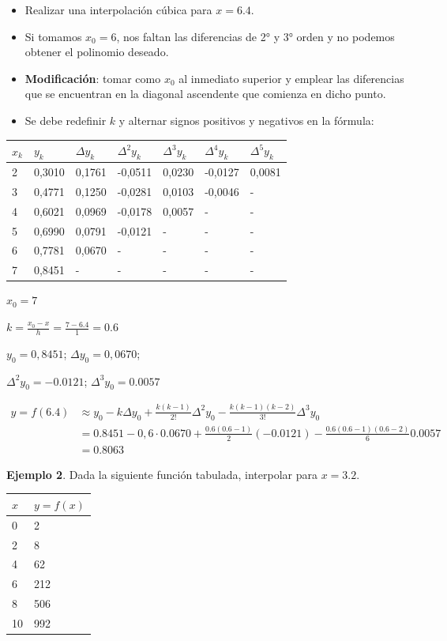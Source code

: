 \documentclass[]{book}
\providecommand{\tightlist}{%
  \setlength{\itemsep}{0pt}\setlength{\parskip}{0pt}}
\begin{document}
\begin{itemize}
\tightlist
\item
  Realizar una interpolación cúbica para \(x=6.4\).
\item
  Si tomamos \(x_0 = 6\), nos faltan las diferencias de 2° y 3° orden y no podemos obtener el polinomio deseado.
\item
  \textbf{Modificación}: tomar como \(x_0\) al inmediato superior y emplear las diferencias que se encuentran en la diagonal ascendente que comienza en dicho punto.
\item
  Se debe redefinir \(k\) y alternar signos positivos y negativos en la fórmula:
\end{itemize}

\begin{longtable}[]{@{}lllllll@{}}
\toprule
\(x_k\) & \(y_k\) & \(\Delta y_k\) & \(\Delta^2 y_k\) & \(\Delta^3 y_k\) & \(\Delta^4 y_k\) & \(\Delta^5 y_k\)\tabularnewline
\midrule
\endhead
2 & 0,3010 & 0,1761 & -0,0511 & 0,0230 & -0,0127 & 0,0081\tabularnewline
3 & 0,4771 & 0,1250 & -0,0281 & 0,0103 & -0,0046 & -\tabularnewline
4 & 0,6021 & 0,0969 & -0,0178 & 0,0057 & - & -\tabularnewline
5 & 0,6990 & 0,0791 & -0,0121 & - & - & -\tabularnewline
6 & 0,7781 & 0,0670 & - & - & - & -\tabularnewline
7 & 0,8451 & - & - & - & - & -\tabularnewline
\bottomrule
\end{longtable}

\(x_0 = 7\)

\(k = \frac{x_0-x}{h} = \frac{7-6.4}{1} = 0.6\)

\(y_0 = 0,8451\); \(\Delta y_0 = 0,0670\);

\(\Delta^2 y_0 = -0.0121\); \(\Delta^3 y_0 = 0.0057\)

\[
\begin{aligned}
y = f(6.4) &\approx y_0 - k \Delta y_0 + \frac{k(k-1)}{2!}\Delta^2 y_0 - \frac{k(k-1)(k-2)}{3!}\Delta^3 y_0  \\
  & = 0.8451 - 0,6 \cdot 0.0670 + \frac{0.6 (0.6-1)}{2} (-0.0121) - \frac{0.6(0.6-1)(0.6-2)}{6} 0.0057\\
  & = 0.8063
\end{aligned}
\]

\textbf{Ejemplo 2}. Dada la siguiente función tabulada, interpolar para \(x = 3.2\).

\begin{longtable}[]{@{}ll@{}}
\toprule
\(x\) & \(y=f(x)\)\tabularnewline
\midrule
\endhead
0 & 2\tabularnewline
2 & 8\tabularnewline
4 & 62\tabularnewline
6 & 212\tabularnewline
8 & 506\tabularnewline
10 & 992\tabularnewline
\bottomrule
\end{longtable}
\end{document}
